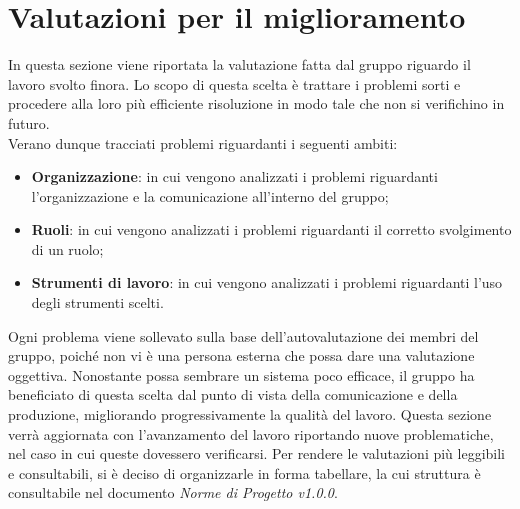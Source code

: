 \section{Valutazioni per il miglioramento}
In questa sezione viene riportata la valutazione fatta dal gruppo riguardo il 
lavoro svolto finora. Lo scopo di questa scelta è trattare i problemi sorti e
procedere alla loro più efficiente risoluzione in modo tale che non si verifichino
in futuro. \\
Verano dunque tracciati problemi riguardanti i seguenti ambiti:

\begin{itemize}
	\item \textbf{Organizzazione}: in cui vengono analizzati i problemi riguardanti 
		l'organizzazione e la comunicazione all'interno del gruppo;
	\item \textbf{Ruoli}: in cui vengono analizzati i problemi riguardanti il 
		corretto svolgimento di un ruolo;
	\item \textbf{Strumenti di lavoro}: in cui vengono analizzati i problemi riguardanti 
		l'uso degli strumenti scelti.
\end{itemize}

\noindent Ogni problema viene sollevato sulla base dell'autovalutazione dei membri del 
gruppo, poiché non vi è una persona esterna che possa dare una valutazione
oggettiva. Nonostante possa sembrare un sistema poco efficace, il gruppo ha 
beneficiato di questa scelta dal punto di vista della comunicazione e  della produzione, migliorando progressivamente la qualità del lavoro.
Questa sezione verrà aggiornata con l'avanzamento del lavoro riportando nuove 
problematiche, nel caso in cui queste dovessero verificarsi.
Per rendere le valutazioni più leggibili e consultabili, si è
deciso di organizzarle in forma tabellare, la cui struttura è 
consultabile nel documento \textit{Norme di Progetto v1.0.0}.

